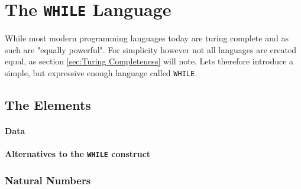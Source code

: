 \section{The {\tt WHILE} Language}
\label{sec:WHILE}
While most modern programming languages today are turing complete and as such
are "equally powerful". For simplicity however not all languages are created
equal, as section \ref{sec:Turing Completeness} will note. Lets therefore
introduce a simple, but expressive enough language called {\tt WHILE}.

\subsection{The Elements} %
\label{sub:The Elements}
\paragraph{Data} %
\label{par:Data}


\paragraph{Alternatives to the {\tt WHILE} construct} %
\label{par:Alternatives to the WHILE construct}
\subsubsection{Natural Numbers} %
\label{ssub:Natural Numbers}

